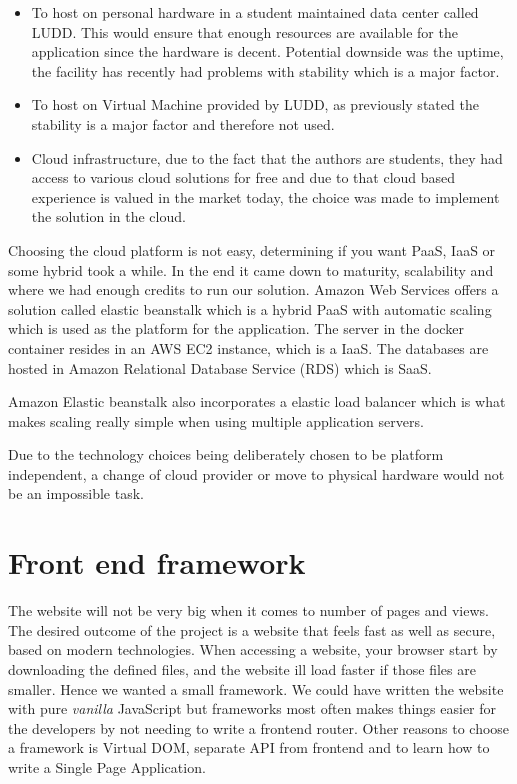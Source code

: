 \documentclass[12pt,a4paper]{report}
\begin{document}
\begin{itemize}
    \item To host on personal hardware in a student maintained data center called LUDD. This would ensure that enough resources are available for the application since the hardware is decent. Potential downside was the uptime, the facility has recently had problems with stability which is a major factor. 
    \item To host on Virtual Machine provided by LUDD, as previously stated the stability is a major factor and therefore not used.
    \item Cloud infrastructure, due to the fact that the authors are students, they had access to various cloud solutions for free and due to that cloud based experience is valued in the market today, the choice was made to implement the solution in the cloud.
\end{itemize}

Choosing the cloud platform is not easy, determining if you want PaaS, IaaS or some hybrid took a while. In the end it came down to maturity, scalability and where we had enough credits to run our solution. Amazon Web Services offers a solution called elastic beanstalk which is a hybrid PaaS with automatic scaling which is used as the platform for the application. The server in the docker container resides in an AWS EC2 instance, which is a IaaS. The databases are hosted in Amazon Relational Database Service (RDS) which is SaaS. 

Amazon Elastic beanstalk also incorporates a elastic load balancer which is what makes scaling really simple when using multiple application servers. 

Due to the technology choices being deliberately chosen to be platform independent, a change of cloud provider or move to physical hardware would not be an impossible task.
\section{Front end framework}
The website will not be very big when it comes to number of pages and views.
The desired outcome of the project is a website that feels fast as well as secure, based on modern technologies. When accessing a website, your browser start by downloading the defined files, and the website ill load faster if those files are smaller. Hence we wanted a small framework.
We could have written the website with pure \textit{vanilla} JavaScript but frameworks most often makes things easier for the developers by not needing to write a frontend router. Other reasons to choose a framework is Virtual DOM, separate API from frontend and to learn how to write a Single Page Application.
\end{document}

